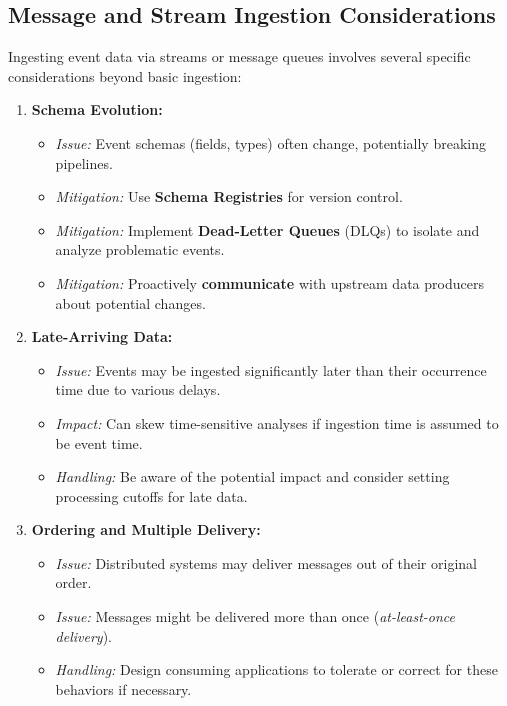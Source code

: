 \subsection{Message and Stream Ingestion Considerations}
Ingesting event data via streams or message queues involves several
specific considerations beyond basic ingestion:
\begin{enumerate} %
    \item \textbf{Schema Evolution:}
    \begin{itemize}[label=\textbullet]
        \item \textit{Issue:} Event schemas (fields, types) often change, potentially breaking pipelines.
        \item \textit{Mitigation:} Use \textbf{Schema Registries} for version control.
        \item \textit{Mitigation:} Implement \textbf{Dead-Letter Queues} (DLQs) to isolate and analyze problematic events.
        \item \textit{Mitigation:} Proactively \textbf{communicate} with upstream data producers about potential changes.
    \end{itemize}

    \item \textbf{Late-Arriving Data:}
    \begin{itemize}[label=\textbullet]
        \item \textit{Issue:} Events may be ingested significantly later than their occurrence time due to various delays.
        \item \textit{Impact:} Can skew time-sensitive analyses if ingestion time is assumed to be event time.
        \item \textit{Handling:} Be aware of the potential impact and consider setting processing cutoffs for late data.
    \end{itemize}

    \item \textbf{Ordering and Multiple Delivery:}
    \begin{itemize}[label=\textbullet]
        \item \textit{Issue:} Distributed systems may deliver messages out of their original order.
        \item \textit{Issue:} Messages might be delivered more than once (\textit{at-least-once delivery}).
        \item \textit{Handling:} Design consuming applications to tolerate or correct for these behaviors if necessary.
    \end{itemize}


\end{enumerate}

